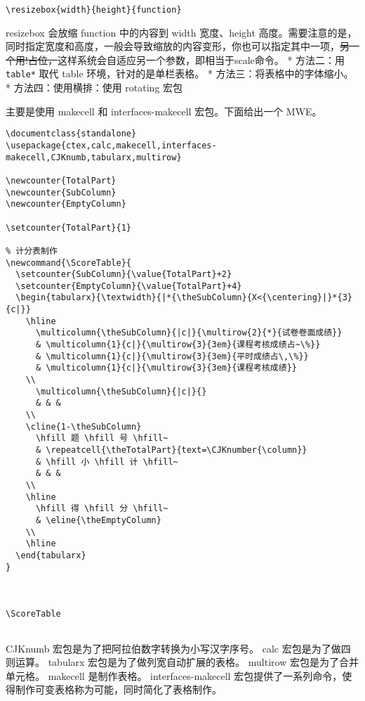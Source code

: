 \begin{verbatim}
\resizebox{width}{height}{function}
\end{verbatim}

resizebox 会放缩 function 中的内容到 width 宽度、height
高度。需要注意的是，同时指定宽度和高度，一般会导致缩放的内容变形，你也可以指定其中一项，\sout{另一个用!占位，}这样系统会自适应另一个参数，即相当于scale命令。
* 方法二：用 \texttt{table*} 取代 table 环境，针对的是单栏表格。 *
方法三：将表格中的字体缩小。 * 方法四：使用横排：使用 rotating 宏包



主要是使用 makecell 和 interfaces-makecell 宏包。下面给出一个 MWE。

\begin{verbatim}
\documentclass{standalone}
\usepackage{ctex,calc,makecell,interfaces-makecell,CJKnumb,tabularx,multirow}

\newcounter{TotalPart}
\newcounter{SubColumn}
\newcounter{EmptyColumn}

\setcounter{TotalPart}{1}

% 计分表制作
\newcommand{\ScoreTable}{
  \setcounter{SubColumn}{\value{TotalPart}+2}
  \setcounter{EmptyColumn}{\value{TotalPart}+4}
  \begin{tabularx}{\textwidth}{|*{\theSubColumn}{X<{\centering}|}*{3}{c|}}
    \hline
      \multicolumn{\theSubColumn}{|c|}{\multirow{2}{*}{试卷卷面成绩}}
      & \multicolumn{1}{c|}{\multirow{3}{3em}{课程考核成绩占~\%}}
      & \multicolumn{1}{c|}{\multirow{3}{3em}{平时成绩占\,\%}}
      & \multicolumn{1}{c|}{\multirow{3}{3em}{课程考核成绩}}
    \\
      \multicolumn{\theSubColumn}{|c|}{}
      & & &
    \\
    \cline{1-\theSubColumn}
      \hfill 题 \hfill 号 \hfill~
      & \repeatcell{\theTotalPart}{text=\CJKnumber{\column}}
      & \hfill 小 \hfill 计 \hfill~
      & & &
    \\
    \hline
      \hfill 得 \hfill 分 \hfill~
      & \eline{\theEmptyColumn}
    \\
    \hline
  \end{tabularx}
}



\ScoreTable


\end{verbatim}

CJKnumb 宏包是为了把阿拉伯数字转换为小写汉字序号。 calc
宏包是为了做四则运算。 tabularx 宏包是为了做列宽自动扩展的表格。
multirow 宏包是为了合并单元格。 makecell 是制作表格。
interfaces-makecell
宏包提供了一系列命令，使得制作可变表格称为可能，同时简化了表格制作。


